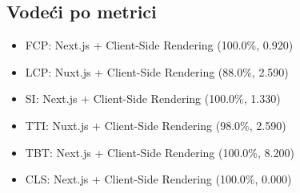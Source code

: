 \subsection{Vodeći po metrici}
\begin{itemize}
    \item FCP: Next.js + Client-Side Rendering (100.0\%, 0.920)
    \item LCP: Nuxt.js + Client-Side Rendering (88.0\%, 2.590)
    \item SI: Next.js + Client-Side Rendering (100.0\%, 1.330)
    \item TTI: Nuxt.js + Client-Side Rendering (98.0\%, 2.590)
    \item TBT: Next.js + Client-Side Rendering (100.0\%, 8.200)
    \item CLS: Next.js + Client-Side Rendering (100.0\%, 0.000)
\end{itemize}



